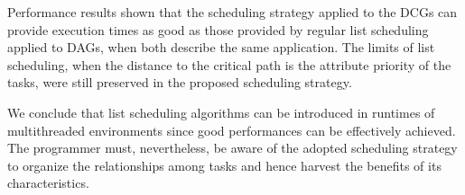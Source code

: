 \documentclass[twocolumn]{svjour3}
\begin{document}
Performance results shown that the scheduling strategy applied to the DCGs can provide execution times as good as those provided by regular list scheduling applied to DAGs, when both describe the same application. The limits of list scheduling, when the distance to the {\color{blue}critical path} is the attribute priority of the tasks, were still preserved in the proposed scheduling strategy.

We conclude that list scheduling algorithms can be introduced in runtimes of multithreaded environments since good performances can be effectively achieved. The programmer must, nevertheless, be aware of the adopted scheduling strategy to organize the relationships among tasks and hence harvest the benefits of its characteristics.



\end{document}

